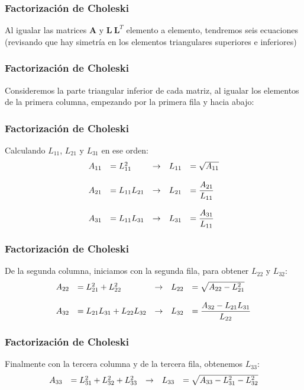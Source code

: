 \begin{frame}
\frametitle{Factorización de Choleski}
Al igualar las matrices $\mathbf{A}$ y $\mathbf{L \: L}^{T}$ elemento a elemento, tendremos seis ecuaciones (revisando que hay simetría en los elementos triangulares superiores e inferiores)
\end{frame}
\begin{frame}
\frametitle{Factorización de Choleski}
Consideremos la parte triangular inferior de cada matriz, al igualar los elementos de la primera columna, empezando por la primera fila y hacia abajo:
\end{frame}
\begin{frame}
\frametitle{Factorización de Choleski}
Calculando $L_{11}$, $L_{21}$ y $L_{31}$ en ese orden:
\[ \begin{array}{l l l l l}
		A_{11} & {=L_{11}^{2}}   & \rightarrow & L_{11} & {=\sqrt{A_{11}}} \\
		&                 &             &        &  \\
		A_{21} & {=L_{11}L_{21}} & \rightarrow & L_{21} & {=\dfrac{A_{21}}{L_{11}}} \\
		&                 &             &        &  \\
		A_{31} & {=L_{11}L_{31}} & \rightarrow & L_{31} & {=\dfrac{A_{31}}{L_{11}}}
	\end{array} \]
\end{frame}
\begin{frame}
\frametitle{Factorización de Choleski}
De la segunda columna, iniciamos con la segunda fila, para obtener $L_{22}$ y $L_{32}$:
\[ \begin{array}{l l l l l}
		A_{22} & {=L_{21}^{2}+L_{22}^{2}}   & \rightarrow & L_{22} & {=\sqrt{A_{22}-L_{21}^{2}}} \\
       			&                 &             &        &  \\
		A_{32} & {=L_{21}L_{31}+L_{22}L_{32}} & \rightarrow & L_{32} & {=\dfrac{A_{32}-L_{21}L_{31}}{L_{22}}} \\
	\end{array} \]
\end{frame}
\begin{frame}
\frametitle{Factorización de Choleski}
Finalmente con la tercera columna y de la tercera fila, obtenemos $L_{33}$:
\[ \begin{array}{l l l l l}
		A_{33} & {=L_{31}^{2}+L_{32}^{2}+L_{33}^{2}} & \rightarrow & L_{33} & {=\sqrt{A_{33}-L_{31}^{2}-L_{32}^{2}}}
\end{array} \]
\end{frame}
